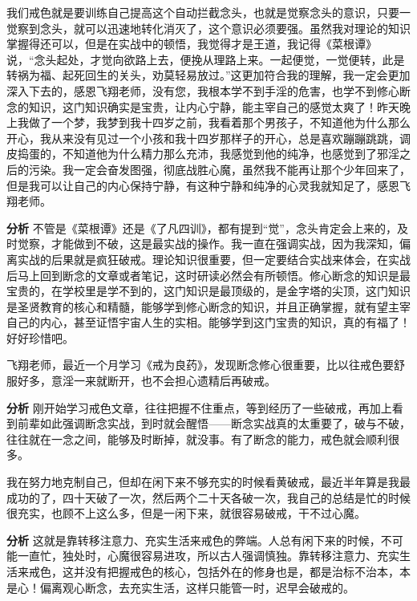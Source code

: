 \begin{case}
    我们戒色就是要训练自己提高这个自动拦截念头，也就是觉察念头的意识，只要一觉察到念头，就可以迅速地转化消灭了，这个意识必须要强。虽然我对理论的知识掌握得还可以，但是在实战中的顿悟，我觉得才是王道，我记得《菜根谭》说，“念头起处，才觉向欲路上去，便挽从理路上来。一起便觉，一觉便转，此是转祸为福、起死回生的关头，劝莫轻易放过。”这更加符合我的理解，我一定会更加深入下去的，感恩飞翔老师，没有您，我根本学不到手淫的危害，也学不到修心断念的知识，这门知识确实是宝贵，让内心宁静，能主宰自己的感觉太爽了！昨天晚上我做了一个梦，我梦到我十四岁之前，我看着那个男孩子，不知道他为什么那么开心，我从来没有见过一个小孩和我十四岁那样子的开心，总是喜欢蹦蹦跳跳，调皮捣蛋的，不知道他为什么精力那么充沛，我感觉到他的纯净，也感觉到了邪淫之后的污染。我一定会奋发图强，彻底战胜心魔，虽然我不能再让那个少年回来了，但是我可以让自己的内心保持宁静，有这种宁静和纯净的心灵我就知足了，感恩飞翔老师。

    \textbf{分析} 不管是《菜根谭》还是《了凡四训》，都有提到“觉”，念头肯定会上来的，及时觉察，才能做到不破，这是最实战的操作。我一直在强调实战，因为我深知，偏离实战的后果就是疯狂破戒。理论知识很重要，但一定要结合实战来体会，在实战后马上回到断念的文章或者笔记，这时研读必然会有所顿悟。修心断念的知识是最宝贵的，在学校里是学不到的，这门知识是最顶级的，是金字塔的尖顶，这门知识是圣贤教育的核心和精髓，能够学到修心断念的知识，并且正确掌握，就有望主宰自己的内心，甚至证悟宇宙人生的实相。能够学到这门宝贵的知识，真的有福了！好好珍惜吧。
\end{case}

\begin{case}
    飞翔老师，最近一个月学习《戒为良药》，发现断念修心很重要，比以往戒色要舒服好多，意淫一来就断开，也不会担心遗精后再破戒。

    \textbf{分析} 刚开始学习戒色文章，往往把握不住重点，等到经历了一些破戒，再加上看到前辈如此强调断念实战，到时就会醒悟——断念实战真的太重要了，破与不破，往往就在一念之间，能够及时断掉，就没事。有了断念的能力，戒色就会顺利很多。
\end{case}

\begin{case}
    我在努力地克制自己，但却在闲下来不够充实的时候看黄破戒，最近半年算是我最成功的了，四十天破了一次，然后两个二十天各破一次，我自己的总结是忙的时候很充实，也顾不上这么多，但是一闲下来，就很容易破戒，干不过心魔。

    \textbf{分析} 这就是靠转移注意力、充实生活来戒色的弊端。人总有闲下来的时候，不可能一直忙，独处时，心魔很容易进攻，所以古人强调慎独。靠转移注意力、充实生活来戒色，这并没有把握戒色的核心，包括外在的修身也是，都是治标不治本，本是心！偏离观心断念，去充实生活，这样只能管一时，迟早会破戒的。
\end{case}

